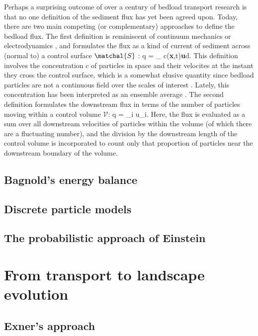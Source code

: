 Perhaps a surprising outcome of over a century of bedload transport research is that no one definition of the sediment flux has yet been agreed upon.
Today, there are two main competing (or complementary) approaches to define the bedload flux. 
The first definition is reminiscent of continuum mechanics or electrodynamics \citep{Landau, Jackson19xx}, and formulates the flux as a kind of current of sediment across (normal to) a control surface $\matchal{S}$ \citep{Furbish2012,Heyman2016}: 
\be q = \int_ c(\textbf{x},t)\textbf{u}\cdot d\textbf{}. \ee
This definition involves the concentration $c$ of particles in space and their velocites at the instant they cross the control surface, which is a somewhat elusive quantity since bedload particles are not a continuous field over the scales of interest \citep{Heyman2016}.
Lately, this concentration has been interpreted as an ensemble average \citep{Furbish2012,Ballio2014}.
The second definition formulates the downstream flux in terms of the number of particles moving within a control volume $\mathcal{V}$:
\be q =  \sum_{i\in{}} u_i.\ee
Here, the flux is evaluated as a sum over all downstream velocities of particles within the volume (of which there are a fluctuating number), and the division by the downstream length of the control volume is incorporated to count only that proportion of particles near the downstream boundary of the volume.

\subsection{Bagnold's energy balance}





\subsection{Discrete particle models}


\subsection{The probabilistic approach of Einstein}


\section{From transport to landscape evolution}


\subsection{Exner's approach} 

